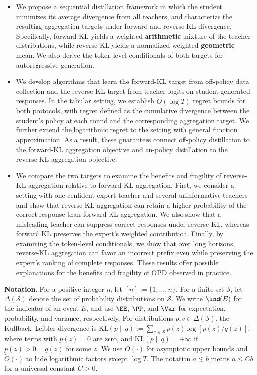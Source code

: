 \documentclass[11pt]{article}
\newcommand{\KL}{\text{KL}}
\begin{document}
\begin{itemize}[leftmargin=*]
    \item We propose a sequential distillation framework in which the student minimizes its average divergence from all teachers, and characterize the resulting aggregation targets under forward and reverse KL divergence. Specifically, forward KL yields a weighted \textbf{arithmetic} mixture of the teacher distributions, while reverse KL yields a normalized weighted \textbf{geometric} mean. We also derive the token-level conditionals of both targets for autoregressive generation.

    \item We develop algorithms that learn the forward-KL target from off-policy data collection and the reverse-KL target from teacher logits on student-generated responses. In the tabular setting, we establish $\widetilde O(\log T)$ regret bounds for both protocols, with regret defined as the cumulative divergence between the student's policy at each round and the corresponding aggregation target. We further extend the logarithmic regret to the setting with general function approximation. As a result, these guarantees connect off-policy distillation to the forward-KL aggregation objective and on-policy distillation to the reverse-KL aggregation objective.

    \item We compare the two targets to examine the benefits and fragility of reverse-KL aggregation relative to forward-KL aggregation. First, we consider a setting with one confident expert teacher and several uninformative teachers and show that reverse-KL aggregation can retain a higher probability of the correct response than forward-KL aggregation. We also show that a misleading teacher can suppress correct responses under reverse KL, whereas forward KL preserves the expert's weighted contribution. Finally, by examining the token-level conditionals, we show that over long horizons, reverse-KL aggregation can favor an incorrect prefix even while preserving the expert's ranking of complete responses. These results offer possible explanations for the benefits and fragility of OPD observed in practice.
\end{itemize}
\noindent\textbf{Notation.}
For a positive integer $n$, let $[n]:=\{1,\ldots,n\}$. For a finite set $\mathcal S$, let $\Delta(\mathcal S)$ denote the set of probability distributions on $\mathcal S$. We write $\ind(E)$ for the indicator of an event $E$, and use $\EE$, $\PP$, and $\Var$ for expectation, probability, and variance, respectively. For distributions $p,q\in\Delta(\mathcal S)$, the Kullback--Leibler divergence is $\KL(p\|q):=\sum_{z\in\mathcal S}p(z)\log[p(z)/q(z)]$, where terms with $p(z)=0$ are zero, and $\KL(p\|q)=+\infty$ if $p(z)>0=q(z)$ for some $z$. We use $O(\cdot)$ for asymptotic upper bounds and $\widetilde O(\cdot)$ to hide logarithmic factors except $\log T$. The notation $a\lesssim b$ means $a\leq Cb$ for a universal constant $C>0$.
\end{document}
